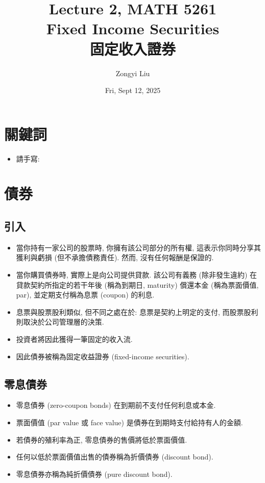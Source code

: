 \documentclass[letterpaper]{article}
\title{Lecture 2, MATH 5261 \\
		\small{Fixed Income Securities\\
			固定收入證券
		}
	}
\author{Zongyi Liu}
\date{Fri, Sept 12, 2025}
\begin{document}
		\maketitle
		
		\tableofcontents
		
		\section{關鍵詞}
		\begin{itemize}
			\item 請手寫:
		\end{itemize}
		
		
		\section{債券}
		\subsection{引入}
		\begin{itemize}
			\item 當你持有一家公司的股票時, 你擁有該公司部分的所有權, 這表示你同時分享其獲利與虧損 (但不承擔債務責任).  然而, 沒有任何報酬是保證的.  
			\item 當你購買債券時, 實際上是向公司提供貸款.  該公司有義務 (除非發生違約) 在貸款契約所指定的若干年後 (稱為到期日, maturity) 償還本金 (稱為票面價值, par), 並定期支付稱為息票 (coupon) 的利息.  
			\item 息票與股票股利類似, 但不同之處在於: 息票是契約上明定的支付, 而股票股利則取決於公司管理層的決策.  
			\item 投資者將因此獲得一筆固定的收入流.  
			\item 因此債券被稱為固定收益證券 (fixed-income securities).  
		\end{itemize}
		
		\subsection{零息債券}
		\begin{itemize}
			\item 零息債券 (zero-coupon bonds) 在到期前不支付任何利息或本金.  
			\item 票面價值 (par value 或 face value) 是債券在到期時支付給持有人的金額.  
			\item 若債券的殖利率為正, 零息債券的售價將低於票面價值.  
			\item 任何以低於票面價值出售的債券稱為折價債券 (discount bond).  
			\item 零息債券亦稱為純折價債券 (pure discount bond).  
		\end{itemize}
		
\end{document}
